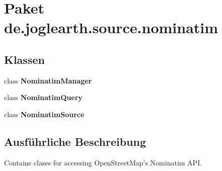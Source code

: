 \section{Paket de.\-joglearth.\-source.\-nominatim}
\label{namespacede_1_1joglearth_1_1source_1_1nominatim}
\subsection*{Klassen}
\begin{DoxyCompactItemize}
\item 
class {\bf Nominatim\-Manager}
\item 
class {\bf Nominatim\-Query}
\item 
class {\bf Nominatim\-Source}
\end{DoxyCompactItemize}


\subsection{Ausführliche Beschreibung}
Contains clases for accessing Open\-Street\-Map's Nominatim A\-P\-I. 